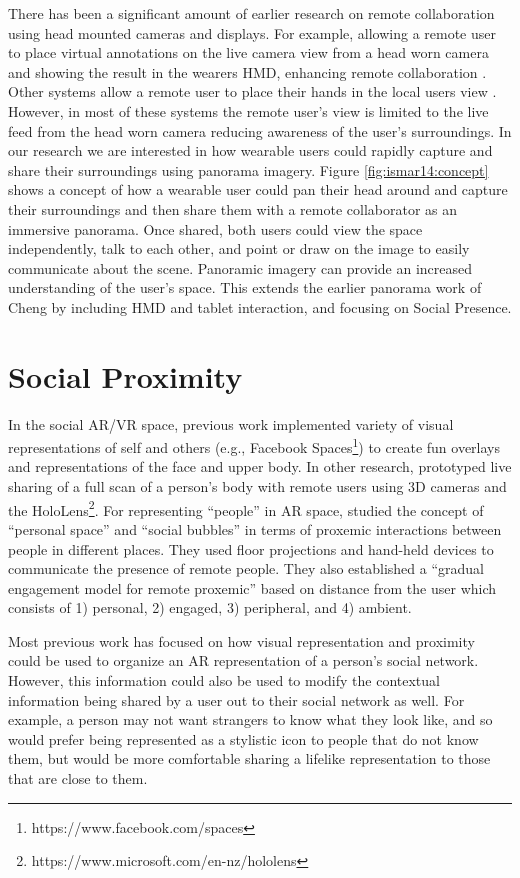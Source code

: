 There has been a significant amount of earlier research on remote collaboration using head mounted cameras and displays. For example, allowing a remote user to place virtual annotations on the live camera view from a head worn camera and showing the result in the wearers HMD, enhancing remote collaboration \cite{Fussell2003}. Other systems allow a remote user to place their hands in the local users view \cite{Huang2013}. 
However, in most of these systems the remote user's view is limited to the live feed from the head worn camera reducing awareness of the user's surroundings. In our research we are interested in how wearable users could rapidly capture and share their surroundings using panorama imagery. Figure \ref{fig:ismar14:concept} shows a concept of how a wearable user could pan their head around and capture their surroundings and then share them with a remote collaborator as an immersive panorama. Once shared, both users could view the space independently, talk to each other, and point or draw on the image to easily communicate about the scene. Panoramic imagery can provide an increased understanding of the user's space. This extends the earlier panorama work of Cheng \cite{L.Cheng1998} by including HMD and tablet interaction, and focusing on Social Presence.

\section{Social Proximity}

In the social AR/VR space, previous work implemented variety of visual representations of self and others (e.g., Facebook Spaces\footnote{https://www.facebook.com/spaces}) to create fun overlays and representations of the face and upper body. In other research, \cite{Fanello2016} prototyped live sharing of a full scan of a person's body with remote users using 3D cameras and the HoloLens\footnote{https://www.microsoft.com/en-nz/hololens}. For representing “people” in AR space, \cite{Sousa2016} studied the concept of \enquote{personal space} and \enquote{social bubbles} in terms of proxemic interactions between people in different places. They used floor projections and hand-held devices to communicate the presence of remote people. They also established a \enquote{gradual engagement model for remote proxemic} based on distance from the user which consists of 1) personal, 2) engaged, 3) peripheral, and 4) ambient.

Most previous work has focused on how visual representation and proximity could be used to organize an AR representation of a person's social network. However, this information could also be used to modify the contextual information being shared by a user out to their social network as well. For example, a person may not want strangers to know what they look like, and so would prefer being represented as a stylistic icon to people that do not know them, but would be more comfortable sharing a lifelike representation to those that are close to them. 

